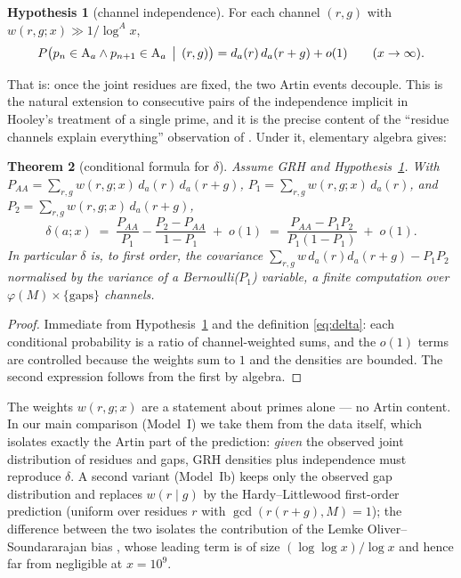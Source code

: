 \documentclass[11pt,reqno]{amsart}
\theoremstyle{plain}
\newtheorem{theorem}{Theorem}
\theoremstyle{definition}
\newtheorem{hypothesis}[theorem]{Hypothesis}
\newcommand{\Art}{\mathrm{A}}
\newcommand{\dA}{d_a}
\begin{document}
\begin{hypothesis}[channel independence]\label{hyp}
For each channel $(r, g)$ with $w(r, g; x) \gg 1/\log^A x$,
\[
P\bigl(p_n \in \Art_a \wedge p_{n+1} \in \Art_a \,\bigm|\, (r, g)\bigr)
= \dA(r)\,\dA(r + g) + o(1) \qquad (x \to \infty).
\]
\end{hypothesis}

That is: once the joint residues are fixed, the two Artin events decouple.
This is the natural extension to consecutive pairs of the independence
implicit in Hooley's treatment of a single prime, and it is the precise
content of the ``residue channels explain everything'' observation of
\cite{BaldI}. Under it, elementary algebra gives:

\begin{theorem}[conditional formula for $\delta$]\label{thm:main}
Assume GRH and Hypothesis~\ref{hyp}. With
$P_{AA} = \sum_{r, g} w(r, g; x)\, \dA(r)\, \dA(r+g)$,
$P_1 = \sum_{r, g} w(r, g; x)\, \dA(r)$, and
$P_2 = \sum_{r, g} w(r, g; x)\, \dA(r+g)$,
\[
\delta(a; x) \;=\; \frac{P_{AA}}{P_1} - \frac{P_2 - P_{AA}}{1 - P_1}
\;+\; o(1)
\;=\; \frac{P_{AA} - P_1 P_2}{P_1 (1 - P_1)} \;+\; o(1).
\]
In particular $\delta$ is, to first order, the covariance
$\sum_{r,g} w \,\dA(r)\dA(r{+}g) - P_1 P_2$ normalised by the variance of a
Bernoulli($P_1$) variable, a finite computation over $\varphi(M) \times
\{\text{gaps}\}$ channels.
\end{theorem}

\begin{proof}
Immediate from Hypothesis~\ref{hyp} and the definition \eqref{eq:delta}:
each conditional probability is a ratio of channel-weighted sums, and the
$o(1)$ terms are controlled because the weights sum to $1$ and the densities
are bounded. The second expression follows from the first by algebra.
\end{proof}

The weights $w(r, g; x)$ are a statement about primes alone --- no Artin
content. In our main comparison (Model~I) we take them from the data itself,
which isolates exactly the Artin part of the prediction: \emph{given} the
observed joint distribution of residues and gaps, GRH densities plus
independence must reproduce $\delta$. A second variant (Model~Ib) keeps only
the observed gap distribution and replaces $w(r \mid g)$ by the
Hardy--Littlewood first-order prediction (uniform over residues $r$ with
$\gcd(r(r+g), M) = 1$); the difference between the two isolates the
contribution of the Lemke Oliver--Soundararajan bias \cite{LOS2016}, whose
leading term is of size $(\log \log x)/\log x$ and hence far from negligible
at $x = 10^9$.
\end{document}
